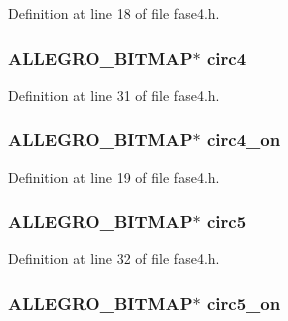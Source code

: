 Definition at line 18 of file fase4.\-h.

\hypertarget{struct_level_quatro_a1adf43c25b4c9b87aeb45c1e4bd24d4f}{
\subsubsection[{circ4}]{\setlength{\rightskip}{0pt plus 5cm}A\-L\-L\-E\-G\-R\-O\-\_\-\-B\-I\-T\-M\-A\-P$\ast$ circ4}}\label{struct_level_quatro_a1adf43c25b4c9b87aeb45c1e4bd24d4f}


Definition at line 31 of file fase4.\-h.

\hypertarget{struct_level_quatro_ae514d3cf3c3cb83de5ab4682ead1c7f6}{
\subsubsection[{circ4\-\_\-on}]{\setlength{\rightskip}{0pt plus 5cm}A\-L\-L\-E\-G\-R\-O\-\_\-\-B\-I\-T\-M\-A\-P$\ast$ circ4\-\_\-on}}\label{struct_level_quatro_ae514d3cf3c3cb83de5ab4682ead1c7f6}


Definition at line 19 of file fase4.\-h.

\hypertarget{struct_level_quatro_a6444f15bb917b382f7e91576f46c2706}{
\subsubsection[{circ5}]{\setlength{\rightskip}{0pt plus 5cm}A\-L\-L\-E\-G\-R\-O\-\_\-\-B\-I\-T\-M\-A\-P$\ast$ circ5}}\label{struct_level_quatro_a6444f15bb917b382f7e91576f46c2706}


Definition at line 32 of file fase4.\-h.

\hypertarget{struct_level_quatro_a1537bde5184cc347504f101c712fb0ee}{
\subsubsection[{circ5\-\_\-on}]{\setlength{\rightskip}{0pt plus 5cm}A\-L\-L\-E\-G\-R\-O\-\_\-\-B\-I\-T\-M\-A\-P$\ast$ circ5\-\_\-on}}\label{struct_level_quatro_a1537bde5184cc347504f101c712fb0ee}


